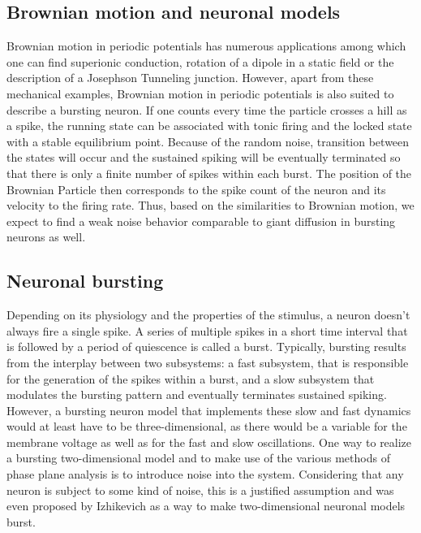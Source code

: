 \documentclass[12pt,a4paper]{article}
\begin{document}
\subsection{Brownian motion and neuronal models}
Brownian motion in periodic potentials has numerous applications among which one can find superionic conduction, rotation of a dipole in a static field or the description of a Josephson Tunneling junction\cite{fpe}. However, apart from these mechanical examples, Brownian motion in periodic potentials is also suited to describe a bursting neuron. If one counts every time the particle crosses a hill as a spike, the running state can be associated with tonic firing and the locked state with a stable equilibrium point. Because of the random noise, transition between the states will occur and the sustained spiking will be eventually terminated so that there is only a finite number of spikes within each burst. The position of the Brownian Particle then corresponds to the spike count of the neuron and its velocity to the firing rate. Thus, based on the similarities to Brownian motion, we expect to find a weak noise behavior comparable to giant diffusion in bursting neurons as well.
\subsection{Neuronal bursting}
Depending on its physiology and the properties of the stimulus, a neuron doesn't always fire a single spike. A series of multiple spikes in a short time interval that is followed by a period of quiescence is called a burst\cite{izi}. Typically, bursting results from the interplay between two subsystems: a fast subsystem, that is responsible for the generation of the spikes within a burst, and a slow subsystem that modulates the bursting pattern and eventually terminates sustained spiking. However, a bursting neuron model that implements these slow and fast dynamics would at least have to be three-dimensional, as there would be a variable for the membrane voltage as well as for the fast and slow oscillations. One way to realize a bursting two-dimensional model and to make use of the various methods of phase plane analysis is to introduce noise into the system. Considering that any neuron is subject to some kind of noise, this is a justified assumption and was even proposed by Izhikevich as a way to make two-dimensional neuronal models burst\cite{izi}.
\end{document}
